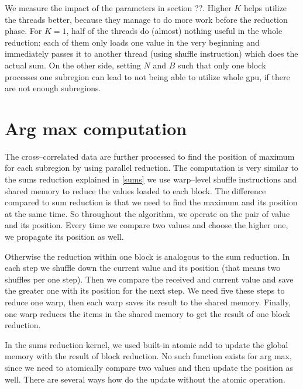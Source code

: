 We measure the impact of the parameters in section ??. Higher $K$ helps utilize the threads better, because they manage to do more work before the reduction phase. For $K = 1$, half of the threads do (almost) nothing useful in the whole reduction: each of them only loads one value in the very beginning and immediately passes it to another thread (using shuffle instruction) which does the actual sum. On the other side, setting $N$ and $B$ such that only one block processes one subregion can lead to not being able to utilize whole gpu, if there are not enough subregions.


\section{Arg max computation}
\label{arg-max}
The cross--correlated data are further processed to find the position of maximum for each subregion by using parallel reduction. The computation is very similar to the sums reduction explained in \cref{sums} we use warp--level shuffle instructions and shared memory to reduce the values loaded to each block. The difference compared to sum reduction is that we need to find the maximum and its position at the same time. So throughout the algorithm, we operate on the pair of value and its position. Every time we compare two values and choose the higher one, we propagate its position as well.

Otherwise the reduction within one block is analogous to the sum reduction. In each step we shuffle down the current value and its position (that means two shuffles per one step). Then we compare the received and current value and save the greater one with its position for the next step. We need five these steps to reduce one warp, then each warp saves its result to the shared memory. Finally, one warp reduces the items in the shared memory to get the result of one block reduction.

In the sums reduction kernel, we used built-in atomic add to update the global memory with the result of block reduction. No such function exists for arg max, since we need to atomically compare two values and then update the position as well. There are several ways how do the update without the atomic operation.

